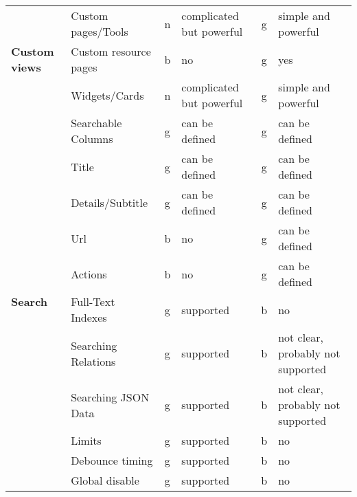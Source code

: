 \begin{table}[h!]
{\begin{tabular}{llclcl}
            \hline
            \multirow{3}{*}{\textbf{Custom views}}   & Custom pages/Tools     & n           & complicated but powerful        & g           & simple and powerful                      \\
            & Custom resource pages  & b           & no                              & g           & yes                                      \\
            & Widgets/Cards          & n           & complicated but powerful        & g           & simple and powerful                      \\
            \hline
            \multirow{12}{*}{\textbf{Search}}        & Searchable Columns     & g           & can be defined                  & g           & can be defined                           \\
            & Title                  & g           & can be defined                  & g           & can be defined                           \\
            & Details/Subtitle       & g           & can be defined                  & g           & can be defined                           \\
            & Url                    & b           & no                              & g           & can be defined                           \\
            & Actions                & b           & no                              & g           & can be defined                           \\
            & Full-Text Indexes      & g           & supported                       & b           & no                                       \\
            & Searching Relations    & g           & supported                       & b           & not clear, probably not supported        \\
            & Searching JSON Data    & g           & supported                       & b           & not clear, probably not supported        \\
            & Limits                 & g           & supported                       & b           & no                                       \\
            & Debounce timing        & g           & supported                       & b           & no                                       \\
            & Global disable         & g           & supported                       & b           & no                                       \\

\end{tabular}}
\end{table}
